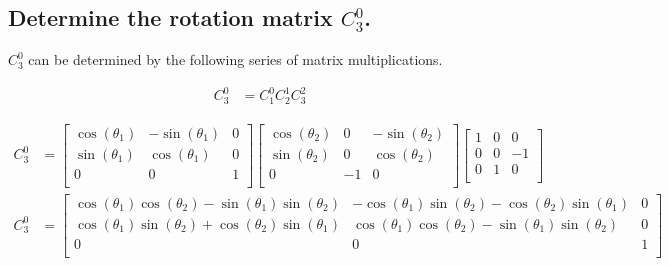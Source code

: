 \begin{parts}
    \part{Determine the rotation matrix $C_3^0$.}

    \solution
    $C_3^0$ can be determined by the following series of matrix multiplications.

    \begin{equation}
        \begin{split}
            C_3^0 & = C_1^0C_2^1C_3^2
        \end{split}
    \end{equation}

    \begin{equation*}
        \begin{split}
            C_3^0 & =
            \begin{bmatrix}
                \cos(\theta_1) & -\sin(\theta_1) & 0 \\
                \sin(\theta_1) & \cos(\theta_1)  & 0 \\
                0              & 0               & 1 \\
            \end{bmatrix}
            \begin{bmatrix}
                \cos(\theta_2) & 0  & -\sin(\theta_2) \\
                \sin(\theta_2) & 0  & \cos(\theta_2)  \\
                0              & -1 & 0               \\
            \end{bmatrix}
            \begin{bmatrix}
                1 & 0 & 0  \\
                0 & 0 & -1 \\
                0 & 1 & 0  \\
            \end{bmatrix} \\
            C_3^0 & =
            \begin{bmatrix}
                \cos(\theta_1)\cos(\theta_2) - \sin(\theta_1)\sin(\theta_2) & -\cos(\theta_1)\sin(\theta_2) - \cos(\theta_2)\sin(\theta_1) & 0 \\
                \cos(\theta_1)\sin(\theta_2) + \cos(\theta_2)\sin(\theta_1) & \cos(\theta_1)\cos(\theta_2)-\sin(\theta_1)\sin(\theta_2)    & 0 \\
                0                                                           & 0                                                            & 1 \\
            \end{bmatrix}
        \end{split}
    \end{equation*}

\end{parts}
